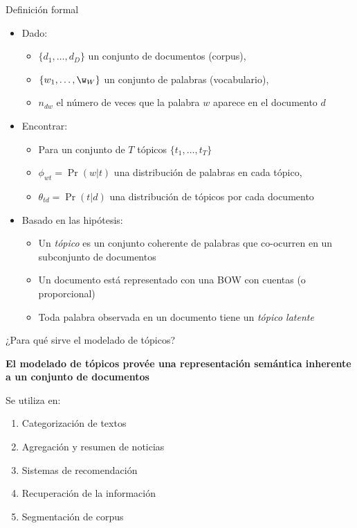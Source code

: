 \documentclass[presentation, t]{beamer}
\begin{document}
\begin{frame}{Definición formal}
\begin{itemize}
\item \alert{Dado}:
\begin{itemize}
\item \(\{d_1, \ldots, d_D\}\) un conjunto de documentos (corpus),
\item \(\{w_1, \ldots, \w_W\}\) un conjunto de palabras (vocabulario),
\item \(n_{dw}\) el número de veces que la palabra \(w\) aparece en el documento \(d\)\vfill
\end{itemize}

\item \alert{Encontrar}:
\begin{itemize}
\item Para un conjunto de \(T\) tópicos \(\{t_1, \ldots, t_T\}\)
\item \(\phi_{wt} = \Pr(w|t)\) una distribución de palabras en cada tópico,
\item \(\theta_{td} = \Pr(t|d)\) una distribución de tópicos por cada documento \vfill
\end{itemize}

\item \alert{Basado en las hipótesis}:
\begin{itemize}
\item Un \emph{tópico} es un conjunto coherente de palabras que co-ocurren en un subconjunto de documentos
\item Un documento está representado con una BOW con cuentas (o proporcional)
\item Toda palabra observada en un documento tiene un \emph{tópico latente}\vfill
\end{itemize}
\end{itemize}
\end{frame}


\begin{frame}{¿Para qué sirve el modelado de tópicos?}
\begin{center}
\bf El modelado de tópicos provée una representación semántica
inherente a un conjunto de documentos
\end{center}

Se utiliza en:

\begin{enumerate}
\item Categorización de textos
\item Agregación y resumen de noticias
\item Sistemas de recomendación
\item Recuperación de la información
\item Segmentación de corpus
\end{enumerate}
\end{frame}
\end{document}
